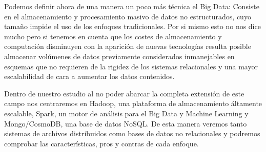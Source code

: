 \documentclass[11pt, a4paper]{article} %
\begin{document}
Podemos definir ahora de una manera un poco más técnica el Big Data: Consiste en el almacenamiento y procesamiento masivo de datos no estructurados, cuyo tamaño impide el uso de los enfoques tradicionales. Por si mismo esto no nos dice mucho pero si tenemos en cuenta que los costes de almacenamiento y computación disminuyen con la aparición de nuevas tecnologías resulta posible almacenar volúmenes de datos previamente considerados inmanejables en esquemas que no requieren de la rigidez de los sistemas relacionales y una mayor escalabilidad de cara a aumentar los datos contenidos.


Dentro de nuestro estudio al no poder abarcar la completa extensión de este campo nos centraremos en Hadoop, una plataforma de almacenamiento áltamente escalable, Spark, un motor de análisis para el Big Data y Machine Learning y Mongo/CosmoDB, una base de datos NoSQL. De esta manera veremos tanto sistemas de archivos distribuidos como bases de datos no relacionales y podremos comprobar las características, pros y contras de cada enfoque.
\end{document}
